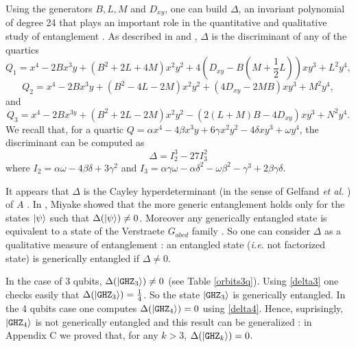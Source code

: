 \documentclass[a4paper,12pt,fleqn]{article}
\newcommand\GHZ{\mathtt{GHZ}}
\begin{document}
  Using the generators $B,L,M$ and $D_{xy}$, one can build $\Delta$, an invariant polynomial of degree 24 that plays an important role in the quantitative and qualitative study of entanglement \cite{2002MW,2003Miyake}.
  As described in \cite{2014HLT} and \cite{2003LT}, $\Delta$ is the discriminant of any of the quartics
\begin{equation}
	Q_{1}=x^{4}-2Bx^{3}y+(B^{2}+2L+4M)x^{2}y^{2}+4(D_{xy}-B(M+\frac12L))xy^{3}+L^{2}y^{4},
\end{equation}\vspace{-2mm}
\begin{equation}
	Q_{2}=x^{4}-2Bx^{3}y+(B^{2}-4L-2M)x^{2}y^{2}+(4D_{xy}-2MB)xy^{3}+M^{2}y^{4},
\end{equation}
and
\begin{equation}
	Q_{3}=x^{4}-2Bx^{3y}+(B^{2}+2L-2M)x^{2}y^{2}-(2(L+M)B-4D_{xy})xy^{3}+N^{2}y^{4}.
\end{equation}
We recall that, for a quartic $Q=\alpha x^{4}-4\beta x^{3}y+6\gamma x^{2}y^{2}-4\delta xy^{3}+\omega y^{4}$, the discriminant can be computed as
\begin{equation}
  \Delta=I_{2}^{3}-27I_{3}^{2}\label{delta4}
\end{equation}
where  $I_{2}=\alpha\omega-4\beta\delta+3\gamma^{2}$ and 
$I_{3}=\alpha\gamma\omega-\alpha\delta^{2}-\omega\beta^{2}-\gamma^{3}+2\beta\gamma\delta$.

  It appears that $\Delta$ is the Cayley hyperdeterminant (in the sense of Gelfand \textit{et al.} \cite{1992GKL}) of $A$ \cite{2003LT}. 
  In \cite{2003Miyake}, Miyake showed that the more generic entanglement holds only for the states $\ket{\psi}$ such that $\Delta(\ket{\psi})\neq 0$. Moreover any generically entangled state is equivalent to a state of the  Verstraete $G_{abcd}$ family \cite[Appendix~A]{2003LT}. So one can consider $\Delta$ as a qualitative measure of entanglement :  an entangled state (\textit{i.e.} not factorized state) is generically entangled if $\Delta\neq 0$.

  In the case of 3 qubits, $\Delta(\ket{\GHZ_3})\neq 0$ (see Table \ref{orbits3q}). Using \eqref{delta3} one checks easily that $\Delta(\ket{\GHZ_3})= \frac14$. So the state $\ket{\GHZ_3}$ is generically entangled. In the 4 qubits case one computes $\Delta(\ket{\GHZ_4})=0$ using \eqref{delta4}. Hence, suprisingly, $\ket{\GHZ_4}$ is not generically entangled and this result can be generalized : in \cite{MBJGL2019} Appendix C we proved that,
  for any $k>3$, $\Delta(\ket{\GHZ_k})=0$.
  
\end{document}
